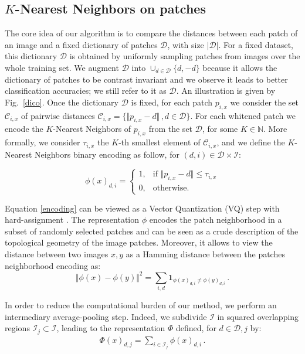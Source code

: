\documentclass{article}
\begin{document}
\subsection{$K$-Nearest Neighbors on patches\label{knn}}
\vspace{-0.1cm}
The core idea of our algorithm is to compare the distances between each patch of an image and a fixed dictionary of patches $\mathcal{D}$, with size $|\mathcal{D}|$.
For a fixed dataset, this dictionary $\mathcal{D}$ is obtained by uniformly sampling patches from images over the whole training set. We augment $\mathcal{D}$ into $\cup_{d\in \mathcal{D}}\{d,-d\}$ because it allows the dictionary of patches to be contrast invariant and we observe it leads to better classification accuracies; we still refer to it as $\mathcal{D}$. An illustration is given by Fig.~\ref{dico}. Once the dictionary $\mathcal{D}$ is fixed, for each patch $p_{i,x}$ we consider the set $\mathcal{C}_{i, x}$ of pairwise distances $\mathcal{C}_{i, x} =\{\Vert p_{i, x} - d \Vert\,, d\in\mathcal{D} \} $.
For each whitened patch we encode the $K$-Nearest Neighbors of $p_{i,x}$ from the set $\mathcal{D}$, for some $ K \in \mathbb{N}$.
More formally, we consider $\tau_{i,x}$ the $K$-th smallest  element of $\mathcal{C}_{i,x}$, and we define the $K$-Nearest Neighbors binary encoding as follow, for $(d,i)\in\mathcal{D}\times\mathcal{I}$:


\begin{equation}
\label{encoding}
\phi(x)_{d,i}=
\begin{cases}
1,&\text{if } \Vert  p_{i,x} - d\Vert \leq \tau_{i,x}\\
0,&\text{otherwise}.
\end{cases} 
\end{equation}

Equation \ref{encoding} can be viewed as a Vector Quantization (VQ) step with hard-assignment \citep{coates2011importance}.
The representation $\phi$ encodes the patch neighborhood in a subset of randomly selected patches and can be seen as a crude description of the topological geometry of the image patches.
Moreover, it allows to view the distance between two images $x,y$ as a Hamming distance between the patches neighborhood encoding as:
\[\Vert \phi(x)-\phi(y)\Vert^2 = \sum_{i,d}\mathbf{1}_{\phi(x)_{d,i} \neq \phi(y)_{d,i}}\,.\]


In order to reduce the computational burden of our method, we perform an intermediary average-pooling step.
Indeed, we subdivide $\mathcal{I}$ in squared overlapping regions $\mathcal{I}_j\subset\mathcal{I}$, leading to the representation $\Phi$ defined, for $d\in\mathcal{D}, j$ by:
\begin{align}\Phi(x)_{d,j}= \sum_{i\in \mathcal{I}_j}\phi(x)_{d,i}\,.\end{align}
\end{document}
